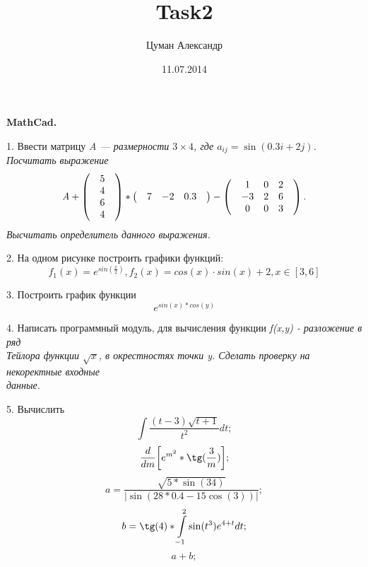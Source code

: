 \documentclass[12pt]{article}
\title{Task2}
\author{Цуман Александр}
\date{11.07.2014}
\begin{document}
\begin{center}\bf MathCad. \rm\end{center}

1. Ввести матрицу \it A \rm --- размерности $3 \times 4$, где $a_{ij} = \sin (0.3i+2j)$. Посчитать выражение
\[ \it A \rm + 
\begin{pmatrix} 
	& 5 & \\ 
	& 4 & \\ 
	& 6 & \\ 
	& 4 & 
\end{pmatrix}
	\ast 
\begin{pmatrix}
	& 7 & -2 & 0.3 &
\end{pmatrix}
	-
\begin{pmatrix}
	& 1 & 0 & 2 &\\
	& -3 & 2 & 6 &\\
	& 0 & 0 & 3 &\\
\end{pmatrix}
	.
\]
Высчитать определитель данного выражения.

2. На одном рисунке построить графики функций:
\begin {equation*}
	f_1(x)=e^{sin(\frac{x}{2})},
	f_2(x)=cos(x)\cdot sin(x)+2, x\in[3,6]
\end {equation*}

3. Построить график функции
\begin {equation*}
	e^{sin(x) \ast cos(y)}
\end {equation*}


4. Написать программный модуль, для вычисления функции \it f(x,y) \rm - разложение в ряд 
	\\Тейлора функции $ \sqrt{x} $, в окрестностях точки y. Сделать проверку на некоректные входные 
	\\данные.	

5. Вычислить
\begin {equation*}
	\int \frac{(t-3)\sqrt{t+1}}{t^2}dt;
\end {equation*}
\begin {equation*}
	\frac{d}{dm}\biggl[e^{m^2} \ast \tg(\frac{3}{m})\biggr];
\end {equation*}
\begin {equation*}
	a=\frac{\sqrt{5 \ast \sin(34)}}{|\sin(28 \ast 0.4 - 15\cos(3))|};
\end {equation*}
\begin {equation*}
	b=\tg(4) \ast \int\limits_{-1}^2 \sin(t^3)e^{4+t}dt;
\end {equation*}
\begin {equation*}
	a+b;
\end {equation*}
\end{document}
